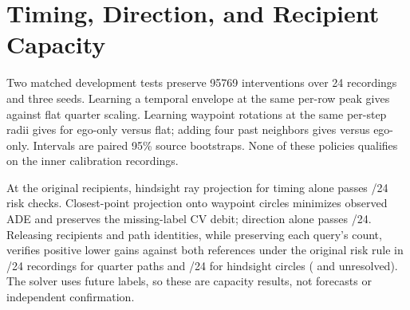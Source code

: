 \section{Timing, Direction, and Recipient Capacity}
Two matched development tests preserve 95769 interventions over 24
recordings and three seeds. Learning a temporal envelope at the same
per-row peak gives \MatchedGeoTiming{} against flat quarter scaling.
Learning waypoint rotations at the same per-step radii gives
\MatchedGeoEgo{} for ego-only versus flat; adding four past neighbors
gives \MatchedGeoPeer{} versus ego-only. Intervals are paired 95\%
source bootstraps. None of these policies qualifies on the inner
calibration recordings.

At the original recipients, hindsight ray projection for timing
alone passes \MatchedGeoTimingPass/24 risk checks. Closest-point
projection onto waypoint circles minimizes observed ADE and
preserves the missing-label CV debit; direction alone passes
\MatchedGeoDirectionPass/24. Releasing recipients and path identities,
while preserving each query's count, verifies positive lower gains
against both references under the original risk rule in
\MatchedGeoFlatBoth/24 recordings for quarter paths and
\MatchedGeoCircleBoth/24 for hindsight circles
(\MatchedGeoFlatUnresolved{} and \MatchedGeoCircleUnresolved{}
unresolved). The solver uses future labels, so these are capacity
results, not forecasts or independent confirmation.
